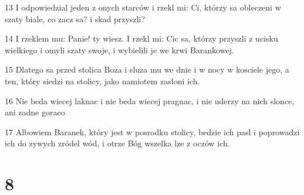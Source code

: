 \par 13 I odpowiedzial jeden z onych starców i rzekl mi: Ci, którzy sa obleczeni w szaty biale, co zacz sa? i skad przyszli?
\par 14 I rzeklem mu: Panie! ty wiesz. I rzekl mi: Cic sa, którzy przyszli z ucisku wielkiego i omyli szaty swoje, i wybielili je we krwi Barankowej.
\par 15 Dlatego sa przed stolica Boza i sluza mu we dnie i w nocy w kosciele jego, a ten, który siedzi na stolicy, jako namiotem zasloni ich.
\par 16 Nie beda wiecej laknac i nie beda wiecej pragnac, i nie uderzy na nich slonce, ani zadne goraco
\par 17 Albowiem Baranek, który jest w posrodku stolicy, bedzie ich pasl i poprowadzi ich do zywych zródel wód, i otrze Bóg wszelka lze z oczów ich.

\chapter{8}

